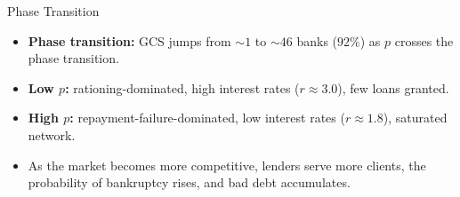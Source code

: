 \begin{frame}{Phase Transition}
  \begin{itemize}
    \item \textbf{Phase transition:} GCS jumps from $\sim 1$ to $\sim 46$ banks ($92\%$) as $p$ crosses the phase transition.
    \item \textbf{Low $p$:} rationing-dominated, high interest rates ($r \approx 3.0$), few loans granted.
    \item \textbf{High $p$:} repayment-failure-dominated, low interest rates ($r \approx 1.8$), saturated network.
    \item As the market becomes more competitive, lenders serve more clients, the probability of bankruptcy rises, and bad debt accumulates.
  \end{itemize}
\end{frame}


